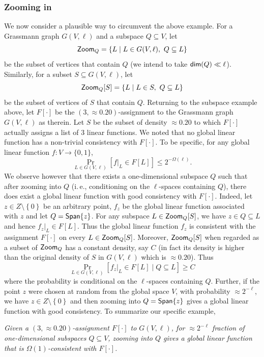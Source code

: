 \documentclass[11pt]{article}
\numberwithin{equation}{section}
\theoremstyle{definition}
\theoremstyle{plain}
\newcommand{\ie}{i.\,e.}
\newcommand\set[1]{{\left\{ #1 \right\}}}
\newcommand\Prob[2]{{\Pr_{#1}\left[ {#2} \right]}}
\newcommand\spn{{\sf Span}}
\begin{document}
\subsubsection{Zooming in}
We now consider a plausible way to circumvent the above example. For a Grassmann graph $G(V,\ell)$
and a subspace $Q \subseteq V$, let 
$$ {\sf Zoom}_Q =  \{ L \mid L \in G(V, \ell), ~Q \subseteq L \}$$
be the subset of vertices that contain $Q$ (we intend to take ${\sf dim}(Q) \ll \ell$).
 Similarly, for a subset $S \subseteq G(V,\ell)$, let 
$$ {\sf Zoom}_Q [S] =  \{ L \mid L \in S, ~Q \subseteq L \}$$
be the subset of vertices of $S$ that contain $Q$.
Returning to the subspace example above, let $F[\cdot]$ be the $(3, \approx 0.20)$-assignment to the Grassmann graph $G(V,\ell)$
as therein. Let $S$ be the subset of density $\approx 0.20$ to which $F[\cdot]$ actually assigns a list of $3$ linear functions.
We noted that no
global linear function has a non-trivial consistency with $F[\cdot]$. To be specific, for any global linear function $f: V \to \{0,1\}$,
 $$  \Prob{L \in G(V, \ell)}{f|_L \in F[L] }   \leqslant 2^{-\Omega(\ell)}.   $$
We observe however that there exists a one-dimensional subspace $Q$ such that after
zooming into $Q$ (\ie, conditioning on the $\ell$-spaces containing $Q$), there does exist a global linear function with good consistency with $F[\cdot]$.
Indeed, let $z \in Z \setminus \set{0}$ be an arbitrary point, $f_z$ be the global linear function associated with $z$ and let
$Q=\spn\set{z}$. For any subspace $L \in {\sf Zoom}_Q[S]$, we have $z \in Q \subseteq L$ and hence $f_z|_L \in F[L]$. Thus the global linear function $f_z$
is consistent with the assignment $F[\cdot]$ on every $L \in {\sf Zoom}_Q[S]$. Moreover,
$ {\sf Zoom}_Q[S] $ when regarded as a subset of ${\sf Zoom}_Q$ has a constant density, say $C$
(in fact its density is higher than the original density of $S$ in $G(V, \ell)$ which is $\approx 0.20$).
Thus $$  \Prob{L \in G(V, \ell)}{f_z|_L \in F[L] \mid Q \subseteq L }   \geqslant   C  $$
where the probability is conditional on the $\ell$-spaces containing $Q$. Further,
if the point $z$ were chosen at random from the global space $V$, with probability $\approx 2^{-\ell}$, we have $z \in Z \setminus \set{0}$ and
      then zooming into $Q = \spn\set{z}$ gives a global linear function with good consistency.
To summarize our specific example,

\medskip
\emph{Given a $(3,\approx 0.20)$-assignment $F[\cdot]$ to $G(V,\ell)$, for $\approx 2^{-\ell}$ fraction of one-dimensional subspaces
$Q \subseteq V$, zooming into $Q$ gives a global linear function that is $\Omega(1)$-consistent with $F[\cdot]$.}
\medskip
\end{document}
